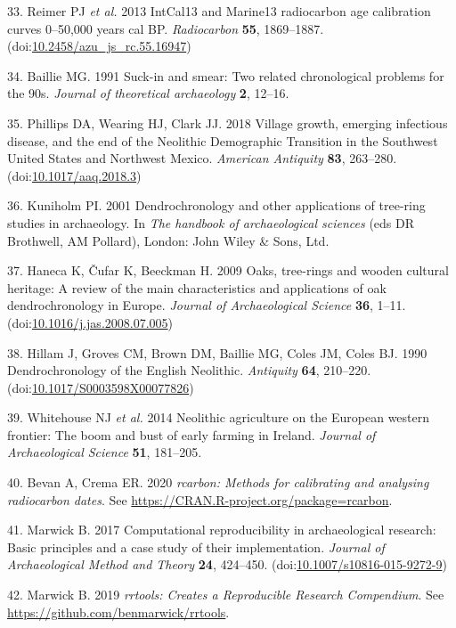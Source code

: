\documentclass[
]{sa}
\newenvironment{cslreferences}%
  {}%
  {\par}
\begin{document}
\begin{cslreferences}
\leavevmode\hypertarget{ref-Reimer2013}{}%
33. Reimer PJ \emph{et al.} 2013 IntCal13 and Marine13 radiocarbon age calibration curves 0--50,000 years cal BP. \emph{Radiocarbon} \textbf{55}, 1869--1887. (doi:\href{https://doi.org/10.2458/azu_js_rc.55.16947}{10.2458/azu\_js\_rc.55.16947})

\leavevmode\hypertarget{ref-Baillie1991}{}%
34. Baillie MG. 1991 Suck-in and smear: Two related chronological problems for the 90s. \emph{Journal of theoretical archaeology} \textbf{2}, 12--16.

\leavevmode\hypertarget{ref-Phillips2018}{}%
35. Phillips DA, Wearing HJ, Clark JJ. 2018 Village growth, emerging infectious disease, and the end of the Neolithic Demographic Transition in the Southwest United States and Northwest Mexico. \emph{American Antiquity} \textbf{83}, 263--280. (doi:\href{https://doi.org/10.1017/aaq.2018.3}{10.1017/aaq.2018.3})

\leavevmode\hypertarget{ref-Kuniholm2001}{}%
36. Kuniholm PI. 2001 Dendrochronology and other applications of tree-ring studies in archaeology. In \emph{The handbook of archaeological sciences} (eds DR Brothwell, AM Pollard), London: John Wiley \& Sons, Ltd.

\leavevmode\hypertarget{ref-Haneca2009}{}%
37. Haneca K, Čufar K, Beeckman H. 2009 Oaks, tree-rings and wooden cultural heritage: A review of the main characteristics and applications of oak dendrochronology in Europe. \emph{Journal of Archaeological Science} \textbf{36}, 1--11. (doi:\href{https://doi.org/10.1016/j.jas.2008.07.005}{10.1016/j.jas.2008.07.005})

\leavevmode\hypertarget{ref-Hillam1990}{}%
38. Hillam J, Groves CM, Brown DM, Baillie MG, Coles JM, Coles BJ. 1990 Dendrochronology of the English Neolithic. \emph{Antiquity} \textbf{64}, 210--220. (doi:\href{https://doi.org/10.1017/S0003598X00077826}{10.1017/S0003598X00077826})

\leavevmode\hypertarget{ref-Whitehouse2014}{}%
39. Whitehouse NJ \emph{et al.} 2014 Neolithic agriculture on the European western frontier: The boom and bust of early farming in Ireland. \emph{Journal of Archaeological Science} \textbf{51}, 181--205.

\leavevmode\hypertarget{ref-rcarbon}{}%
40. Bevan A, Crema ER. 2020 \emph{rcarbon: Methods for calibrating and analysing radiocarbon dates}. See \url{https://CRAN.R-project.org/package=rcarbon}.

\leavevmode\hypertarget{ref-Marwick2017}{}%
41. Marwick B. 2017 Computational reproducibility in archaeological research: Basic principles and a case study of their implementation. \emph{Journal of Archaeological Method and Theory} \textbf{24}, 424--450. (doi:\href{https://doi.org/10.1007/s10816-015-9272-9}{10.1007/s10816-015-9272-9})

\leavevmode\hypertarget{ref-rrtools}{}%
42. Marwick B. 2019 \emph{rrtools: Creates a Reproducible Research Compendium}. See \url{https://github.com/benmarwick/rrtools}.
\end{cslreferences}
\end{document}

